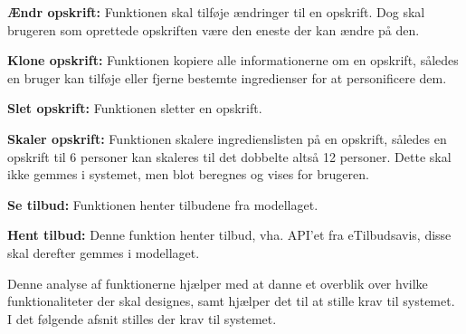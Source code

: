 \textbf{Ændr opskrift:} Funktionen skal tilføje ændringer til en opskrift. Dog skal brugeren som oprettede opskriften være den eneste der kan ændre på den. 

\textbf{Klone opskrift:} Funktionen kopiere alle informationerne om en opskrift, således en bruger kan tilføje eller fjerne bestemte ingredienser for at personificere dem.

\textbf{Slet opskrift:} Funktionen sletter en opskrift.

\textbf{Skaler opskrift:} Funktionen skalere ingredienslisten på en opskrift, således en opskrift til 6 personer kan skaleres til det dobbelte altså 12 personer. Dette skal ikke gemmes i systemet, men blot beregnes og vises for brugeren.		

\textbf{Se tilbud:} Funktionen henter tilbudene fra modellaget.

\textbf{Hent tilbud:} Denne funktion henter tilbud, vha. API'et fra eTilbudsavis, disse skal derefter gemmes i modellaget.


Denne analyse af funktionerne hjælper med at danne et overblik over hvilke funktionaliteter der skal designes, samt hjælper det til at stille krav til systemet.
I det følgende afsnit stilles der krav til systemet.
